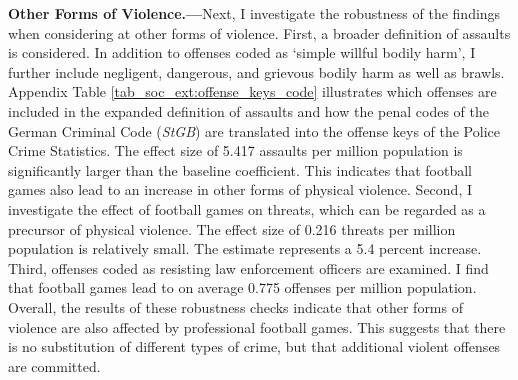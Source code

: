 
\textbf{Other Forms of Violence.---}Next, I investigate the robustness of the findings when considering at other forms of violence. First, a broader definition of assaults is considered. In addition to offenses coded as `simple willful bodily harm', I further include negligent, dangerous, and grievous bodily harm as well as brawls. Appendix Table \ref{tab_soc_ext:offense_keys_code} illustrates which offenses are included in the expanded definition of assaults and how the penal codes of the German Criminal Code (\textit{StGB}) are translated into the offense keys of the Police Crime Statistics. The effect size of 5.417 assaults per million population is significantly larger than the baseline coefficient. This indicates that football games also lead to an increase in other forms of physical violence. Second, I investigate the effect of football games on threats, which can be regarded as a precursor of physical violence. The effect size of 0.216 threats per million population is relatively small. The estimate represents a 5.4 percent increase. Third, offenses coded as resisting law enforcement officers are examined. I find that football games lead to on average 0.775 offenses per million population. Overall, the results of these robustness checks indicate that other forms of violence are also affected by professional football games. This suggests that there is no substitution of different types of crime, but that additional violent offenses are committed.\newline



